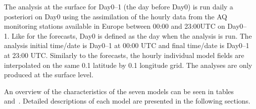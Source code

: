 \documentclass[9pt]{report}
\begin{document}
The analysis at the surface for Day0–1 (the day before Day0) is run daily a posteriori on Day0 using the assimilation of the hourly data from the AQ monitoring stations available in Europe between 00:00 and 23:00UTC on Day0– 1.
Like for the forecasts, Day0 is defined as the day when the analysis is run.
The analysis initial time/date is Day0–1 at 00:00 UTC and final time/date is Day0–1 at 23:00 UTC.
Similarly to the forecasts, the hourly individual model fields are interpolated on the same 0.1\textdegree{} latitude by 0.1\textdegree{} longitude grid.
The analyses are only produced at the surface level.%

An overview of the characteristics of the seven models can be seen in tables~ and~.
Detailed descriptions of each model are presented in the following sections.%
\end{document}
